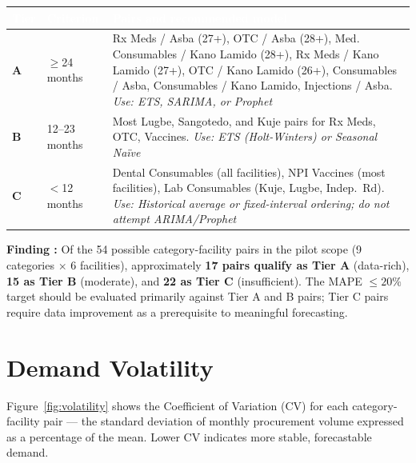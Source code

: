 \documentclass[12pt, a4paper]{article}
\newcounter{finding}
\newcommand{\finding}[1]{%
  \stepcounter{finding}%
  \begin{mdframed}[style=greenbox]
  \textbf{Finding \thefinding:} #1
  \end{mdframed}%
}
\begin{document}
\vspace{0.6em}
\noindent
\begin{tabularx}{\textwidth}{@{} C{2cm} L{3cm} X @{}}
  \toprule
  \textcolor{white}{\textbf{Tier}} &
  \textcolor{white}{\textbf{Criterion}} &
  \textcolor{white}{\textbf{Pairs and recommended model}} \\
  \midrule
  \textbf{A} & $\geq$24 months &
    Rx Meds / Asba (27+), OTC / Asba (28+), Med. Consumables / Kano Lamido (28+),
    Rx Meds / Kano Lamido (27+), OTC / Kano Lamido (26+), Consumables / Asba,
    Consumables / Kano Lamido, Injections / Asba.
    \newline\textit{Use: ETS, SARIMA, or Prophet} \\
  \textbf{B} & 12--23 months &
    Most Lugbe, Sangotedo, and Kuje pairs for Rx Meds, OTC, Vaccines.
    \newline\textit{Use: ETS (Holt-Winters) or Seasonal Na\"{i}ve} \\
  \textbf{C} & $<$12 months &
    Dental Consumables (all facilities), NPI Vaccines (most facilities),
    Lab Consumables (Kuje, Lugbe, Indep.\ Rd).
    \newline\textit{Use: Historical average or fixed-interval ordering;
    do not attempt ARIMA/Prophet} \\
  \bottomrule
\end{tabularx}

\vspace{0.8em}

\finding{Of the 54 possible category-facility pairs in the pilot scope
(9 categories $\times$ 6 facilities), approximately \textbf{17 pairs
qualify as Tier A} (data-rich), \textbf{15 as Tier B} (moderate), and
\textbf{22 as Tier C} (insufficient). The MAPE $\leq 20\%$ target should
be evaluated primarily against Tier A and B pairs; Tier C pairs require
data improvement as a prerequisite to meaningful forecasting.}

\section{Demand Volatility}

Figure~\ref{fig:volatility} shows the Coefficient of Variation (CV)
for each category-facility pair --- the standard deviation of monthly
procurement volume expressed as a percentage of the mean. Lower CV
indicates more stable, forecastable demand.
\end{document}
